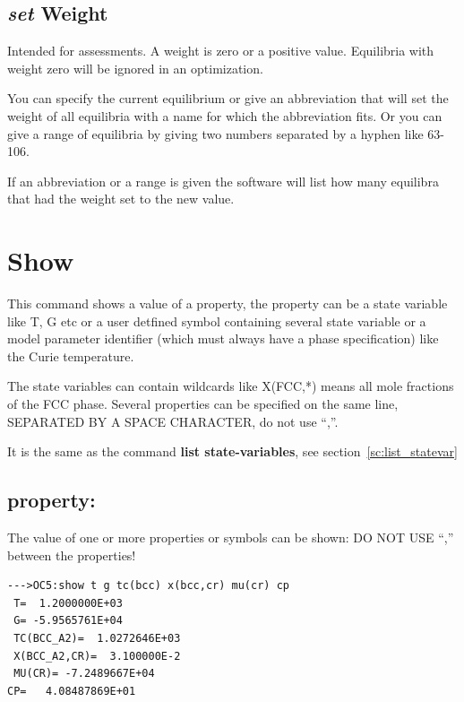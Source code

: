 \documentclass[11pt]{article}
\begin{document}
\subsection{{\em set} Weight}\label{sc:setw}

Intended for assessments.  A weight is zero or a positive value.
Equilibria with weight zero will be ignored in an optimization.  

You can specify the current equilibrium or give an abbreviation that
will set the weight of all equilibria with a name for which the
abbreviation fits.  Or you can give a range of equilibria by giving
two numbers separated by a hyphen like 63-106.

If an abbreviation or a range is given the software will list how many
equilibra that had the weight set to the new value.

\hypertarget{Show property}{}
\section{Show }\label{sc:show}

This command shows a value of a property, the property can be a state
variable like T, G etc or a user detfined symbol containing several
state variable or a model parameter identifier (which must always have
a phase specification) like the Curie temperature.

The state variables can contain wildcards like X(FCC,*) means all mole
fractions of the FCC phase.  Several properties can be specified on
the same line, SEPARATED BY A SPACE CHARACTER, do not use ``,''.

It is the same as the command {\bf list state-variables}, see
section~\ref{sc:list_statevar}

\hypertarget{property:}{}
\subsection{property:}

The value of one or more properties or symbols can be shown:
DO NOT USE ``,'' between the properties!

{\small
\begin{verbatim}
--->OC5:show t g tc(bcc) x(bcc,cr) mu(cr) cp
 T=  1.2000000E+03
 G= -5.9565761E+04
 TC(BCC_A2)=  1.0272646E+03
 X(BCC_A2,CR)=  3.100000E-2
 MU(CR)= -7.2489667E+04
CP=   4.08487869E+01
\end{verbatim}
}
\end{document}
